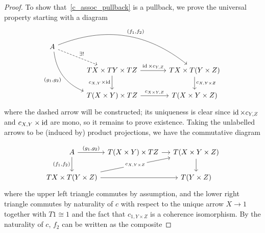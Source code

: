\documentclass[a4paper,UKenglish,numberwithinsect,cleveref, autoref, thm-restate]{lipics-v2021}
\theoremstyle{plain} %
\theoremstyle{definition} %
\begin{document}
\begin{proof}
	To show that~\eqref{c_assoc_pullback} is a pullback, we prove the universal property starting with a diagram
	\begin{equation}
		\label{candidate_pullback}
		\begin{tikzcd}[column sep=3pc]
			A \ar[bend left]{drr}{(f_1, f_2)} \ar[bend right,swap]{ddr}{(g_1, g_2)} \ar[dashed]{dr}{\exists!}							\\
				& TX \times TY \times TZ \ar{r}{\id \times c_{Y,Z}} \ar[swap]{d}{c_{X,Y} \times \id}	& TX \times T(Y \times Z) \ar{d}{c_{X,Y \times Z}}	\\
				& T(X \times Y) \times TZ \ar{r}{c_{X\times Y,Z}}						& T(X \times Y \times Z)
		\end{tikzcd}
	\end{equation}
	where the dashed arrow will be constructed; its uniqueness is clear since $\operatorname{ id} \times c_{Y,Z}$ and $c_{X,Y} \times \operatorname{ id}$ are mono, so it remains to prove existence.
	Taking the unlabelled arrows to be (induced by) product projections, we have the commutative diagram
	\iffalse
	\[
		\begin{tikzcd}[column sep=small]
			A \ar{r}{(g_1, g_2)} \ar[swap]{d}{(f_1, f_2)}					& T(X \times Y) \times TZ \ar{r}{c_{X \times Y, Z}} 	& T(X \times Y \times Z) \ar{d}	\\
			TX \times T(Y \times Z) \ar{rr}	\ar["c_{X,Y \times Z}" description]{urr} 	&							& T(Y \times Z)
		\end{tikzcd}
	\]
	\fi
\[\begin{tikzcd}[column sep=tiny]
	A & {T(X\times Y)\times TZ} && {T(X\times Y\times Z)} \\
	{TX\times T(Y\times Z)} &&& {T(Y\times Z)}
	\arrow["{(g_1,g_2)}", from=1-1, to=1-2]
	\arrow["{(f_1,f_2)}"', from=1-1, to=2-1]
	\arrow[from=1-4, to=2-4]
	\arrow[from=2-1, to=2-4]
	\arrow["{c_{X,Y\times Z}}"{description}, from=2-1, to=1-4]
	\arrow[from=1-2, to=1-4]
\end{tikzcd}\]
	where the upper left triangle commutes by assumption, and the lower right triangle commutes by naturality of $c$ with respect to the unique arrow $X \to 1$ together with $T1 \cong 1$ and the fact that $c_{1,Y \times Z}$ is a coherence isomorphism.
	By the naturality of $c$, $f_2$ can be written as the composite

\end{proof}
\end{document}
